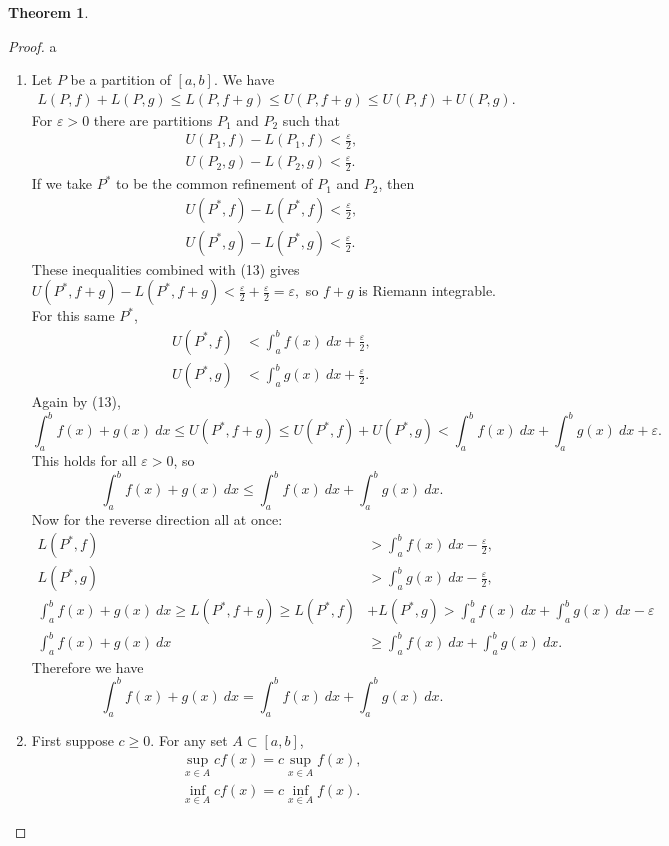 \documentclass{article}
\theoremstyle{definition}
\newtheorem{theorem}{Theorem}[section]
\begin{document}
\begin{theorem}
\begin{proof}{\color{white}a}
	\begin{enumerate}
	\item Let $ P $ be a partition of $ [a,b] $. We have 
	\begin{align}
	L(P,f)+L(P,g)\le L(P,f+g)\le U(P,f+g)\le U(P,f)+U(P,g).
	\end{align}
	For $ \varepsilon>0 $ there are partitions $ P_1 $ and $ P_2 $ such that\begin{align*}
	U(P_1,f)-L(P_1,f)<\frac{\varepsilon}{2},\\
	U(P_2,g)-L(P_2,g)<\frac{\varepsilon}{2}.
	\end{align*}
	If we take $ P^* $ to be the common refinement of $ P_1 $ and $ P_2 $, then 
	\begin{align*}
	U( P^*,f)-L( P^*,f)<\frac{\varepsilon}{2},\\
	U( P^*,g)-L( P^*,g)<\frac{\varepsilon}{2}.
	\end{align*}
	These inequalities combined with (13) gives $U(P^*,f+g)-L(P^*,f+g)<\frac{\varepsilon}{2}+\frac{\varepsilon}{2}=\varepsilon ,$ so $ f+g $ is Riemann integrable.
	For this same $ P^* $, \begin{align*}
		U(P^*,f)&<\int_{a}^{b} f(x)\ dx +\frac{\varepsilon}{2},\\
		U(P^*,g)&<\int_{a}^{b} g(x)\ dx +\frac{\varepsilon}{2}.
	\end{align*}
	Again by (13), $$ \int_{a}^{b}f(x)+g(x)\ dx\le U(P^*,f+g)\le U(P^*,f)+U(P^*,g)<\int_{a}^{b} f(x)\ dx +\int_{a}^{b} g(x)\ dx +\varepsilon.$$ This holds for all $ \varepsilon>0 $, so $$\int_{a}^{b}f(x)+g(x)\ dx\le\int_{a}^{b} f(x)\ dx +\int_{a}^{b} g(x)\ dx. $$ Now for the reverse direction all at once: 
	\begin{align*}
	L(P^*,f)&>\int_{a}^{b} f(x)\ dx -\frac{\varepsilon}{2},\\
	L(P^*,g)&>\int_{a}^{b} g(x)\ dx -\frac{\varepsilon}{2},\\
	\int_{a}^{b}f(x)+g(x)\ dx\ge L(P^*,f+g)\ge L(P^*,f)&+L(P^*,g)>\int_{a}^{b} f(x)\ dx +\int_{a}^{b} g(x)\ dx -\varepsilon\\\int_{a}^{b}f(x)+g(x)\ dx&\ge\int_{a}^{b} f(x)\ dx +\int_{a}^{b} g(x)\ dx.
	\end{align*}
	Therefore we have $$\int_{a}^{b}f(x)+g(x)\ dx=\int_{a}^{b} f(x)\ dx +\int_{a}^{b} g(x)\ dx. $$
 	\item 	First suppose $ c\ge 0 $. For any set $ A\subset [a,b] $, \begin{align*}
 		\sup\limits_{x\in A} cf(x)=c\sup\limits_{x\in A} f(x),\\\inf\limits_{x\in A} cf(x)=c\inf\limits_{x\in A} f(x).

\end{align*}
\end{enumerate}
\end{proof}
\end{theorem}
\end{document}
